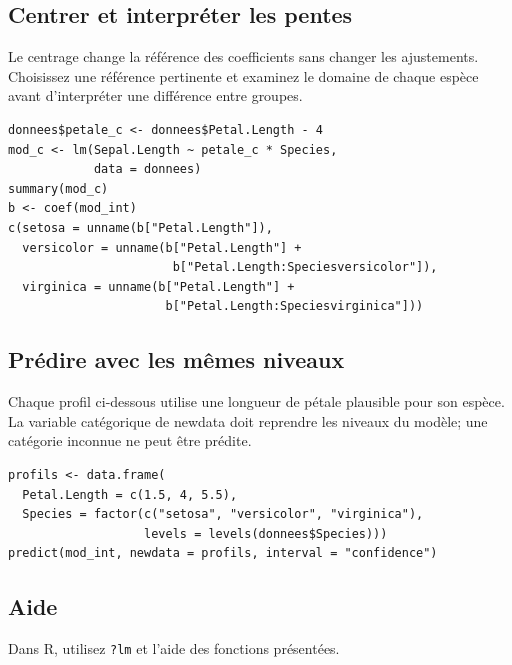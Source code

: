 \documentclass[letterpaper,11pt]{article}
\begin{document}
\par\medskip\noindent\begin{minipage}{\linewidth}
\subsection*{Centrer et interpréter les pentes}
Le centrage change la référence des coefficients sans changer les ajustements. Choisissez une référence pertinente et examinez le domaine de chaque espèce avant d'interpréter une différence entre groupes.
\begin{Verbatim}
donnees$petale_c <- donnees$Petal.Length - 4
mod_c <- lm(Sepal.Length ~ petale_c * Species,
            data = donnees)
summary(mod_c)
b <- coef(mod_int)
c(setosa = unname(b["Petal.Length"]),
  versicolor = unname(b["Petal.Length"] +
                       b["Petal.Length:Speciesversicolor"]),
  virginica = unname(b["Petal.Length"] +
                      b["Petal.Length:Speciesvirginica"]))
\end{Verbatim}

\end{minipage}\par
\par\medskip\noindent\begin{minipage}{\linewidth}
\subsection*{Prédire avec les mêmes niveaux}
Chaque profil ci-dessous utilise une longueur de pétale plausible pour son espèce. La variable catégorique de newdata doit reprendre les niveaux du modèle; une catégorie inconnue ne peut être prédite.
\begin{Verbatim}
profils <- data.frame(
  Petal.Length = c(1.5, 4, 5.5),
  Species = factor(c("setosa", "versicolor", "virginica"),
                   levels = levels(donnees$Species)))
predict(mod_int, newdata = profils, interval = "confidence")
\end{Verbatim}

\end{minipage}\par
\par\medskip\noindent\begin{minipage}{\linewidth}
\subsection*{Aide}
Dans R, utilisez \texttt{?lm} et l’aide des fonctions présentées. 
\end{minipage}\par
\end{document}
